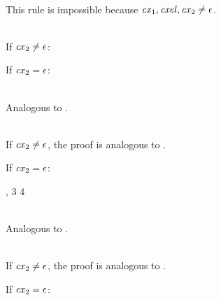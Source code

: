\begin{bycase}

\Case{\Rcxmt}\\
This rule is impossible because $\mathit{cx}_1,\mathit{cxel},\mathit{cx}_2\neq\epsilon$.

\Case{\Rcxtdec}\\
If $\mathit{cx}_2\neq\epsilon$:
\begin{derivation}
\end{derivation}

If $\mathit{cx}_2=\epsilon$:
\begin{derivation}
\end{derivation}

\Case{\Rcxtvdec}\\
Analogous to \Rcxtdec.

\Case{\Rcxodec}\\
If $\mathit{cx}_2\neq\epsilon$, the proof is analogous to \Rcxtdec.

If $\mathit{cx}_2=\epsilon$:
\begin{derivation}
\steP{\EXISTS{\onam,\tvarS,\typ}{\cxel=\odecO}}
     {\indhyp, 3}
     {4}
\end{derivation}

\Case{\Rcxax, \Rcxlem}\\
Analogous to \Rcxodec.

\Case{\Rcxvdec}\\
If $\mathit{cx}_2\neq\epsilon$, the proof is analogous to \Rcxtdec.

If $\mathit{cx}_2=\epsilon$:
\begin{derivation}
\steP{\EXISTS{\var,\typ}{\cxel=\vdecO}}
\end{derivation}


\end{bycase}
